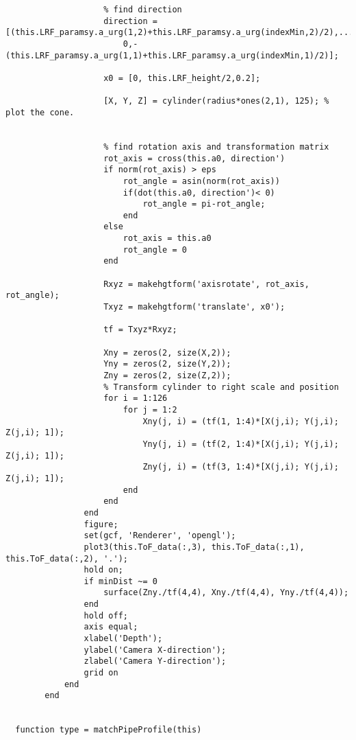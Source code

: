 \begin{lstlisting}
                    % find direction
                    direction = [(this.LRF_paramsy.a_urg(1,2)+this.LRF_paramsy.a_urg(indexMin,2)/2),...
                        0,-(this.LRF_paramsy.a_urg(1,1)+this.LRF_paramsy.a_urg(indexMin,1)/2)];
                    
                    x0 = [0, this.LRF_height/2,0.2];
                 
                    [X, Y, Z] = cylinder(radius*ones(2,1), 125); % plot the cone.
                    
                    
                    % find rotation axis and transformation matrix
                    rot_axis = cross(this.a0, direction')
                    if norm(rot_axis) > eps
                        rot_angle = asin(norm(rot_axis))
                        if(dot(this.a0, direction')< 0)
                            rot_angle = pi-rot_angle;
                        end
                    else
                        rot_axis = this.a0
                        rot_angle = 0
                    end
                    
                    Rxyz = makehgtform('axisrotate', rot_axis, rot_angle);
                    Txyz = makehgtform('translate', x0');
                    
                    tf = Txyz*Rxyz;
                    
                    Xny = zeros(2, size(X,2));
                    Yny = zeros(2, size(Y,2));
                    Zny = zeros(2, size(Z,2));
                    % Transform cylinder to right scale and position
                    for i = 1:126
                        for j = 1:2
                            Xny(j, i) = (tf(1, 1:4)*[X(j,i); Y(j,i); Z(j,i); 1]);
                            Yny(j, i) = (tf(2, 1:4)*[X(j,i); Y(j,i); Z(j,i); 1]);
                            Zny(j, i) = (tf(3, 1:4)*[X(j,i); Y(j,i); Z(j,i); 1]);
                        end
                    end
                end
                figure;
                set(gcf, 'Renderer', 'opengl');
                plot3(this.ToF_data(:,3), this.ToF_data(:,1), this.ToF_data(:,2), '.');
                hold on;
                if minDist ~= 0
                    surface(Zny./tf(4,4), Xny./tf(4,4), Yny./tf(4,4));
                end
                hold off;
                axis equal;
                xlabel('Depth');
                ylabel('Camera X-direction');
                zlabel('Camera Y-direction');
                grid on
            end
        end
 
  
  function type = matchPipeProfile(this)
            

\end{lstlisting}
